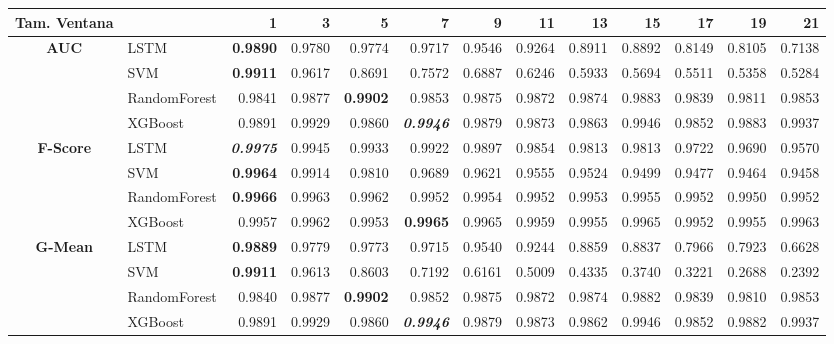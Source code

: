 \begin{table}[H]
	\centering
	\begin{adjustbox}{max width=12cm}
		\begin{tabular}{|c|l|r|r|r|r|r|r|r|r|r|r|r|}
			\hline
			\textbf{Tam. Ventana}&         &      1  &      3  &      5  &      7  &      9  &      11 &      13 &      15 &      17 &      19 &      21 \\
			\hline
			\textbf{AUC} &  LSTM & \textbf{  0.9890 } &  0.9780 &  0.9774 &  0.9717 &  0.9546 &  0.9264 &  0.8911 &  0.8892 &  0.8149 &  0.8105 &  0.7138 \\
			&  SVM & \textbf{  0.9911 } &  0.9617 &  0.8691 &  0.7572 &  0.6887 &  0.6246 &  0.5933 &  0.5694 &  0.5511 &  0.5358 &  0.5284 \\
			&  RandomForest &  0.9841 &  0.9877 & \textbf{  0.9902 } &  0.9853 &  0.9875 &  0.9872 &  0.9874 &  0.9883 &  0.9839 &  0.9811 &  0.9853 \\
			&  XGBoost &  0.9891 &  0.9929 &  0.9860 & \textit{ \textbf{  0.9946 } } &  0.9879 &  0.9873 &  0.9863 &  0.9946 &  0.9852 &  0.9883 &  0.9937 \\
			\hline
			\textbf{F-Score} &  LSTM & \textit{ \textbf{  0.9975 } } &  0.9945 &  0.9933 &  0.9922 &  0.9897 &  0.9854 &  0.9813 &  0.9813 &  0.9722 &  0.9690 &  0.9570 \\
			&  SVM & \textbf{  0.9964 } &  0.9914 &  0.9810 &  0.9689 &  0.9621 &  0.9555 &  0.9524 &  0.9499 &  0.9477 &  0.9464 &  0.9458 \\
			&  RandomForest & \textbf{  0.9966 } &  0.9963 &  0.9962 &  0.9952 &  0.9954 &  0.9952 &  0.9953 &  0.9955 &  0.9952 &  0.9950 &  0.9952 \\
			&  XGBoost &  0.9957 &  0.9962 &  0.9953 & \textbf{  0.9965 } &  0.9965 &  0.9959 &  0.9955 &  0.9965 &  0.9952 &  0.9955 &  0.9963 \\
			\hline
			\textbf{G-Mean} &  LSTM & \textbf{  0.9889 } &  0.9779 &  0.9773 &  0.9715 &  0.9540 &  0.9244 &  0.8859 &  0.8837 &  0.7966 &  0.7923 &  0.6628 \\
			&  SVM & \textbf{  0.9911 } &  0.9613 &  0.8603 &  0.7192 &  0.6161 &  0.5009 &  0.4335 &  0.3740 &  0.3221 &  0.2688 &  0.2392 \\
			&  RandomForest &  0.9840 &  0.9877 & \textbf{  0.9902 } &  0.9852 &  0.9875 &  0.9872 &  0.9874 &  0.9882 &  0.9839 &  0.9810 &  0.9853 \\
			&  XGBoost &  0.9891 &  0.9929 &  0.9860 & \textit{ \textbf{  0.9946 } } &  0.9879 &  0.9873 &  0.9862 &  0.9946 &  0.9852 &  0.9882 &  0.9937 \\

\end{tabular}
\end{adjustbox}
\end{table}
